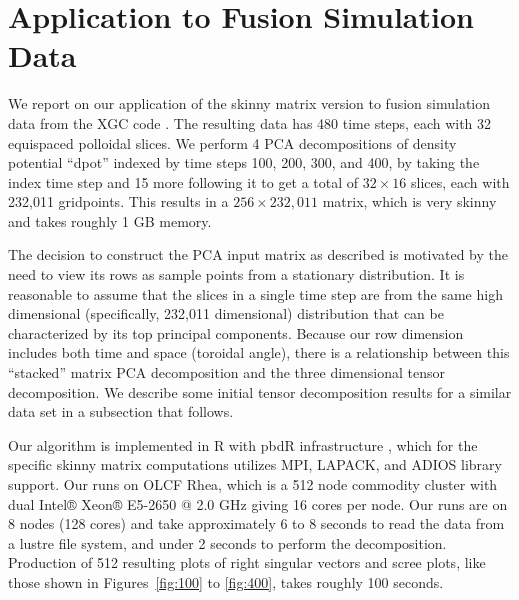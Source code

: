 \newpage
\section{Application to Fusion Simulation Data}
\label{sec:xgc}
We report on our application of the skinny matrix version to fusion
simulation data from the XGC code \cite{??}. The resulting data has
480 time steps, each with 32 equispaced polloidal slices. We perform 4
PCA decompositions of density potential ``dpot'' indexed by time steps
100, 200, 300, and 400, by taking the index time step and 15 more
following it to get a total of $32\times 16$ slices, each with 232,011
gridpoints. This results in a $256\times 232,011$ matrix, which is
very skinny and takes roughly 1 GB memory.

The decision to construct the PCA input matrix as described is
motivated by the need to view its rows as sample points from a
stationary distribution. It is reasonable to assume that the slices in
a single time step are from the same high dimensional (specifically,
232,011 dimensional) distribution that can be characterized by its top
principal components. Because our row dimension includes both time and
space (toroidal angle), there is a relationship between this
``stacked'' matrix PCA decomposition and the three dimensional tensor
decomposition. We describe some initial tensor decomposition results
for a similar data set in a subsection that follows.

Our algorithm is implemented in R with pbdR infrastructure
\cite{Schmidt2017}, which for the specific skinny matrix computations
utilizes MPI, LAPACK, and ADIOS library support. Our runs on OLCF
Rhea, which is a 512 node commodity cluster with dual Intel® Xeon®
E5-2650 @ 2.0 GHz giving 16 cores per node. Our runs are on 8 nodes
(128 cores) and take approximately 6 to 8 seconds to read the data
from a lustre file system, and under 2 seconds to perform the
decomposition. Production of 512 resulting plots of right singular
vectors and scree plots, like those shown in Figures~\ref{fig:100} to
\ref{fig:400}, takes roughly 100 seconds.


